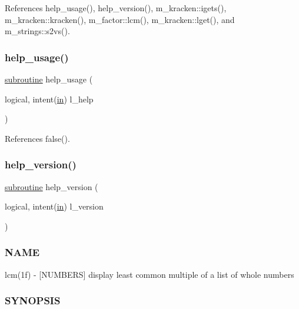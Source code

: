 References help\+\_\+usage(), help\+\_\+version(), m\+\_\+kracken\+::igets(), m\+\_\+kracken\+::kracken(), m\+\_\+factor\+::lcm(), m\+\_\+kracken\+::lget(), and m\+\_\+strings\+::s2vs().

\mbox{\label{lcm_8f90_a3e09a3b52ee8fb04eeb93fe5761626a8}} 
\subsubsection{\texorpdfstring{help\+\_\+usage()}{help\_usage()}}
{\footnotesize\ttfamily \hyperlink{M__stopwatch_83_8txt_acfbcff50169d691ff02d4a123ed70482}{subroutine} help\+\_\+usage (\begin{DoxyParamCaption}\item[{logical, intent(\hyperlink{M__journal_83_8txt_afce72651d1eed785a2132bee863b2f38}{in})}]{l\+\_\+help }\end{DoxyParamCaption})}



References false().

\mbox{\label{lcm_8f90_a39c21619b08a3c22f19e2306efd7f766}} 
\subsubsection{\texorpdfstring{help\+\_\+version()}{help\_version()}}
{\footnotesize\ttfamily \hyperlink{M__stopwatch_83_8txt_acfbcff50169d691ff02d4a123ed70482}{subroutine} help\+\_\+version (\begin{DoxyParamCaption}\item[{logical, intent(\hyperlink{M__journal_83_8txt_afce72651d1eed785a2132bee863b2f38}{in})}]{l\+\_\+version }\end{DoxyParamCaption})}



\subsubsection*{N\+A\+ME}

lcm(1f) -\/ \mbox{[}N\+U\+M\+B\+E\+RS\mbox{]} display least common multiple of a list of whole numbers 

\subsubsection*{S\+Y\+N\+O\+P\+S\+IS}

